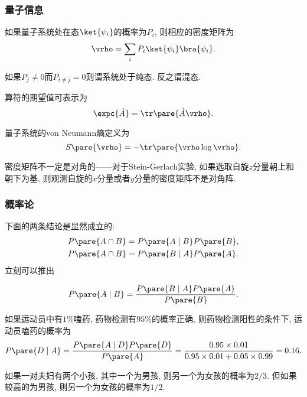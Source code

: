 \documentclass[../Thermal.tex]{subfiles}
\begin{document}
\subsubsection{量子信息}
\begin{definition}[密度矩阵]
如果量子系统处在态$\ket{\psi_i}$的概率为$P_i$, 则相应的密度矩阵为
\[ \vrho = \sum_i P_i \ket{\psi_i} \bra{\psi_i}. \]
\end{definition}
\begin{definition}[纯态]
如果$P_j \neq 0$而$P_{i\neq j} = 0$则谓系统处于纯态. 反之谓混态.
\end{definition}
\begin{definition}[算符的期望值]
算符的期望值可表示为
\[ \expc{\hat{A}} = \tr \pare{\hat{A}\vrho}. \]
\end{definition}
\begin{definition}
量子系统的von Neumann熵定义为
\[ S\pare{\vrho} = -\tr\pare{\vrho \log \vrho}. \]
\end{definition}
\begin{ex}
密度矩阵不一定是对角的——对于Stein-Gerlach实验, 如果选取自旋$z$分量朝上和朝下为基, 则观测自旋的$x$分量或者$y$分量的密度矩阵不是对角阵.
\end{ex}
\subsubsection{概率论}
下面的两条结论是显然成立的:
\begin{align*}
P\pare{A\cap B} &= P\pare{A\mid B}P\pare{B}, \\
P\pare{A\cap B} &= P\pare{B\mid A}P\pare{A}.
\end{align*}
立刻可以推出
\begin{theorem}[Bayes定理]
\begin{finale}
\[ P\pare{A\mid B} = \frac{P\pare{B\mid A}P\pare{A}}{P\pare{B}}. \]
\end{finale}
\end{theorem}
\begin{ex}
如果运动员中有$1\%$嗑药, 药物检测有$95\%$的概率正确, 则药物检测阳性的条件下, 运动员嗑药的概率为
\[ P\pare{D\mid A} = \frac{P\pare{A\mid D}P\pare{D}}{P\pare{A}} = \frac{0.95\times 0.01}{0.95\times 0.01 + 0.05\times 0.99} = 0.16. \]
\end{ex}
\begin{ex}[可分辨性]
如果一对夫妇有两个小孩, 其中一个为男孩, 则另一个为女孩的概率为$2/3$. 但如果较高的为男孩, 则另一个为女孩的概率为$1/2$.
\end{ex}
\end{document}
